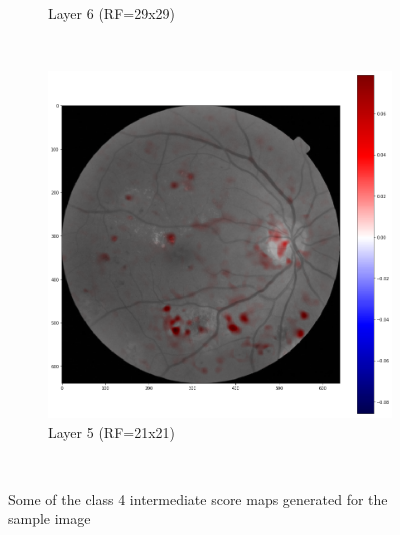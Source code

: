\begin{figure}[!ht]
\begin{subfigure}{0.4\textwidth}
		\caption{Layer 6 (RF=29x29)}
		\label{score:fig:score_rf29}
	\end{subfigure}
	~ %
	\begin{subfigure}{0.4\textwidth}
		\includegraphics[width=\textwidth]{Figures/chapter_interpretation/figures/maps/rf21c.png}
		\caption{Layer 5 (RF=21x21)}
		\label{score:fig:score_rf21}
	\end{subfigure}\\
	\caption[Class 4 sample intermediate score maps]{Some of the class 4 intermediate score maps generated for the sample image}
	\label{score:fig:scoremaps2}
\end{figure}



